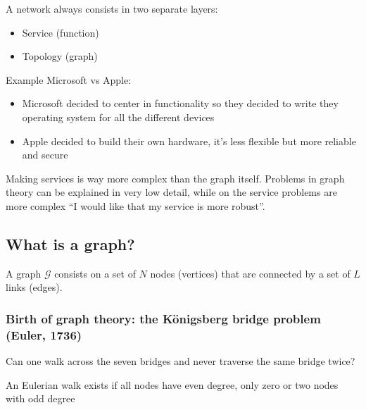 A network always consists in two separate layers:
\begin{itemize}
  \item Service (function)
  \item Topology (graph)
\end{itemize}

Example Microsoft vs Apple:
\begin{itemize}
  \item Microsoft decided to center in functionality so they decided to write they operating
  system for all the different devices
  \item Apple decided to build their own hardware, it's less flexible but more reliable and secure
\end{itemize}

Making services is way more complex than the graph itself. Problems in graph theory can be 
explained in very low detail, while on the service problems are more complex ``I would like
that my service is more robust''. 

\subsection{What is a graph?}

A graph $\mathcal{G}$ consists on a set of $N$ nodes (vertices) that are connected by a set of 
$L$ links (edges).

\subsubsection{Birth of graph theory: the Königsberg bridge problem (Euler, 1736)}

Can one walk across the seven bridges and never traverse the same bridge twice?

\begin{figure}[H]
  \centering
\end{figure}

An Eulerian walk exists if all nodes have even degree, only zero or two nodes with odd degree





